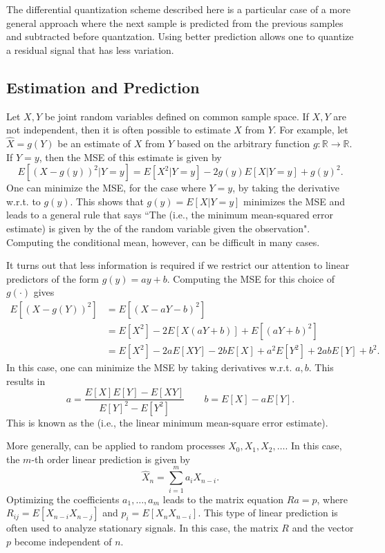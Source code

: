 The differential quantization scheme described here is a particular case of a more general approach where the next sample is predicted from the previous samples and subtracted before quantzation.
Using better prediction allows one to quantize a residual signal that has less variation.

\subsection{Estimation and Prediction}

Let $X,Y$ be joint random variables defined on common sample space.
If $X,Y$ are not independent, then it is often possible to estimate $X$ from $Y$.
For example, let $\hat{X} = g(Y)$ be an estimate of $X$ from $Y$ based on the arbitrary function $g:\mathbb{R}\rightarrow\mathbb{R}$.
If $Y=y$, then the MSE of this estimate is given by
\[ E \left[ (X-g(y))^2 | Y=y \right] = E\left[ X^2 | Y=y \right] - 2 g(y) E \left[ X | Y=y \right] + g(y)^2. \]
One can minimize the MSE, for the case where $Y=y$, by taking the derivative w.r.t. to $g(y)$.
This shows that $g(y) = E \left[X | Y=y \right]$ minimizes the MSE and leads to a general rule that says ``The  (i.e., the minimum mean-squared error estimate) is given by the  of the random variable given the observation".
Computing the conditional mean, however, can be difficult in many cases.

It turns out that less information is required if we restrict our attention to linear predictors of the form $g(y) = ay+b$.
Computing the MSE for this choice of $g(\cdot)$ gives
\begin{align*}
E \left[ (X-g(Y))^2 \right]
&= E \left[ (X-aY-b)^2 \right] \\
&= E\left[ X^2 \right] - 2 E \left[ X (aY+b) \right] + E\left[ (aY+b)^2 \right] \\
&= E\left[ X^2 \right] - 2 a E \left[ X Y \right] - 2b E\left[X\right] + a^2 E\left[Y^2 \right] + 2ab E\left[Y \right] + b^2.
\end{align*}
In this case, one can minimize the MSE by taking derivatives w.r.t. $a,b$.
This results in
\[ a = \frac{E[X]E[Y]-E[XY]}{E[Y]^2-E[Y^2]} \quad \quad b= E[X]-a E[Y]. \]
This is known as the  (i.e., the linear minimum mean-square error estimate).

More generally,  can be applied to random processes $X_0,X_1,X_2,\ldots$.
In this case, the $m$-th order linear prediction is given by
\[ \hat{X}_n = \sum_{i=1}^m a_i X_{n-i}. \]
Optimizing the coefficients $a_1,\ldots,a_m$ leads to the matrix equation $R a = p$, where $R_{ij} = E \left[ X_{n-i} X_{n-j} \right]$ and $p_i = E \left[ X_n X_{n-i} \right]$.
This type of linear prediction is often used to analyze stationary signals.
In this case, the matrix $R$ and the vector $p$ become independent of $n$.

